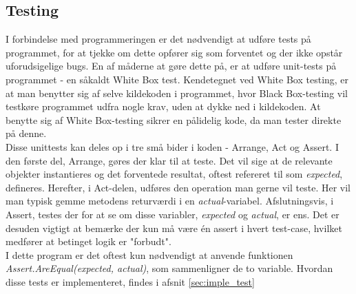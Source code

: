 
\subsection{Testing}
\label{sec:metode_testing}
I forbindelse med programmeringen er det nødvendigt at udføre tests på programmet, for at tjekke om dette opfører sig som forventet og der ikke opstår uforudsigelige bugs. En af måderne at gøre dette på, er at udføre unit-tests på programmet - en såkaldt White Box test. Kendetegnet ved White Box testing, er at man benytter sig af selve kildekoden i programmet, hvor Black Box-testing vil testkøre programmet udfra nogle krav, uden at dykke ned i kildekoden. At benytte sig af White Box-testing sikrer en pålidelig kode, da man tester direkte på denne.\\

Disse unittests kan deles op i tre små bider i koden - Arrange, Act og Assert. I den første del, Arrange, gøres der klar til at teste. Det vil sige at de relevante objekter instantieres og det forventede resultat, oftest refereret til som \textit{expected}, defineres. Herefter, i Act-delen, udføres den operation man gerne vil teste. Her vil man typisk gemme metodens returværdi i en \textit{actual}-variabel. Afslutningsvis, i Assert, testes der for at se om disse variabler, \textit{expected} og \textit{actual}, er ens. Det er desuden vigtigt at bemærke der kun må være én assert i hvert test-case, hvilket medfører at betinget logik er "forbudt"\mbox{}.\\

I dette program er det oftest kun nødvendigt at anvende funktionen \textit{Assert.AreEqual(expected, actual)}, som sammenligner de to variable. Hvordan disse tests er implementeret, findes i afsnit \ref{sec:imple_test}